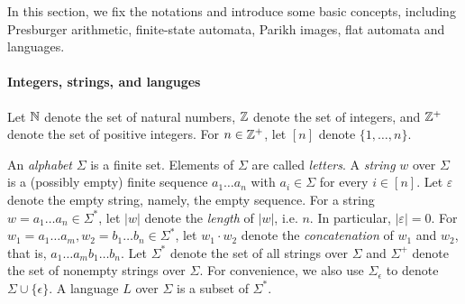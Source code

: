 

In this section, we fix the notations and introduce some basic concepts, including Presburger arithmetic, finite-state automata, Parikh images, flat automata and languages.

\paragraph{Integers, strings, and languges}
Let $\mathbb{N}$ denote the set of natural numbers, $\mathbb{Z}$ denote the set of integers, and $\mathbb{Z}^+$ denote the set of positive integers. For $n \in \mathbb{Z}^+$, let $[n]$ denote $\{1,\dots,n\}$.

An \emph{alphabet} $\Sigma$ is a finite set. Elements of $\Sigma$ are called \emph{letters}.
A \emph{string} $w$ over $\Sigma$ is a (possibly empty) finite sequence $a_1\ldots a_n$ with $a_i \in \Sigma$ for every $i \in [n]$. Let $\varepsilon$ denote the empty string, namely, the empty sequence. For a string $w = a_1 \ldots a_n \in \Sigma^*$, let $|w|$ denote the \emph{length} of $|w|$, i.e. $n$. In particular, $|\varepsilon| = 0$.
%
For $w_1 = a_1 \ldots a_m, w_2 = b_1 \ldots b_n\in \Sigma^*$, 
let $w_1\cdot w_2$ denote the \emph{concatenation} of $w_1$ and $w_2$, that is, $a_1 \ldots a_m b_1 \ldots b_n$.
%
Let $\Sigma^*$ denote the set of all strings over $\Sigma$ and $\Sigma^+$ denote the set of nonempty strings over $\Sigma$. 
For convenience, we also use $\Sigma_{\epsilon}$ to denote $\Sigma \cup \{\epsilon\}$.
%
A language $L$ over $\Sigma$ is a subset of $\Sigma^*$.

